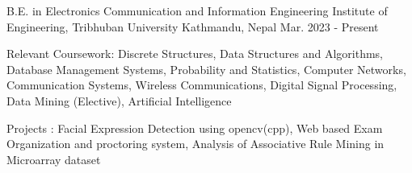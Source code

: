 

\begin{cventries}

  \cventry
    {B.E. in Electronics Communication and Information Engineering} %
    {Institute of Engineering, Tribhuban University} %
    {Kathmandu, Nepal} %
    {Mar. 2023 - Present} %
    {
      \begin{cvitems} %
        \item { Relevant Coursework: Discrete Structures, Data Structures and Algorithms, Database Management Systems, Probability and Statistics, Computer Networks, Communication Systems, Wireless Communications, Digital Signal Processing, Data Mining (Elective), Artificial Intelligence}
        \item {Projects : Facial Expression Detection using opencv(cpp), Web based Exam Organization and proctoring system, Analysis of Associative Rule Mining in Microarray dataset}
      \end{cvitems}
    }

\end{cventries}
